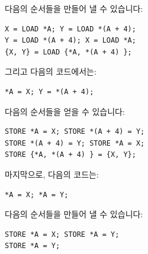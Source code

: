 \begin{enumerate}
\begin{enumerate}
	다음의 순서들을 만들어 낼 수 있습니다:

\vspace{5pt}
\begin{minipage}[t]{\columnwidth}
\scriptsize
\begin{verbatim}
X = LOAD *A; Y = LOAD *(A + 4);
Y = LOAD *(A + 4); X = LOAD *A;
{X, Y} = LOAD {*A, *(A + 4) };
\end{verbatim}
\end{minipage}
\vspace{5pt}

	그리고 다음의 코드에서는:

\vspace{5pt}
\begin{minipage}[t]{\columnwidth}
\scriptsize
\begin{verbatim}
*A = X; Y = *(A + 4);
\end{verbatim}
\end{minipage}
\vspace{5pt}

	다음의 순서들을 얻을 수 있습니다:

\vspace{5pt}
\begin{minipage}[t]{\columnwidth}
\scriptsize
\begin{verbatim}
STORE *A = X; STORE *(A + 4) = Y;
STORE *(A + 4) = Y; STORE *A = X;
STORE {*A, *(A + 4) } = {X, Y};
\end{verbatim}
\end{minipage}
\vspace{5pt}

	마지막으로, 다음의 코드는:

\vspace{5pt}
\begin{minipage}[t]{\columnwidth}
\scriptsize
\begin{verbatim}
*A = X; *A = Y;
\end{verbatim}
\end{minipage}
\vspace{5pt}

	다음의 순서들을 만들어 낼 수 있습니다:

\vspace{5pt}
\begin{minipage}[t]{\columnwidth}
\scriptsize
\begin{verbatim}
STORE *A = X; STORE *A = Y;
STORE *A = Y;
\end{verbatim}
\end{minipage}
\vspace{5pt}


\end{enumerate}
\end{enumerate}
